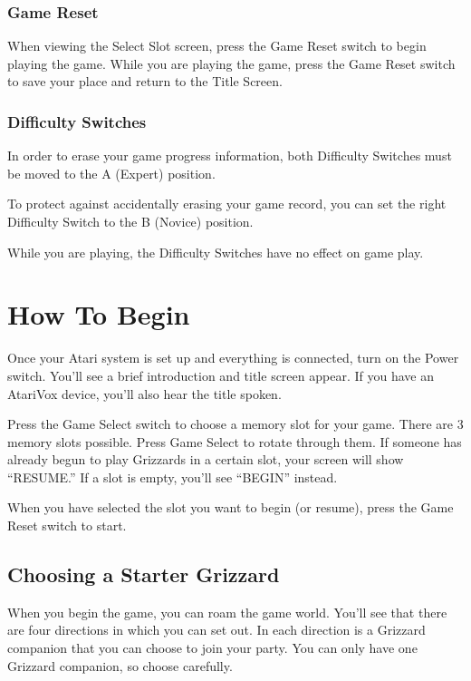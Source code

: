 \documentclass[10pt,twoside,openright]{memoir}
\begin{document}
\subsection{Game Reset}

When viewing  the Select  Slot screen,  press the  Game Reset  switch to
begin playing the  game. While you are playing the  game, press the Game
Reset switch to save your place and return to the Title Screen.

\subsection{Difficulty Switches}

In order to erase your game progress information, both Difficulty
Switches must be moved to the A (Expert) position.

To protect  against accidentally erasing  your game record, you  can set
the right Difficulty Switch to the B (Novice) position.

While  you  are playing,  the  Difficulty  Switches  have no  effect  on
game play. 

\chapter{How To Begin}

Once your Atari system is set up and everything is connected, turn on the
Power switch. You'll see a brief introduction and title screen appear. If
you have an AtariVox device, you'll also hear the title spoken.

Press the Game Select switch to choose a memory slot for your game. There
are 3 memory slots possible. Press Game Select to rotate through them. If
someone has already begun to play Grizzards in a certain slot, your screen
will show ``RESUME.'' If a slot is empty, you'll see ``BEGIN'' instead.

When you have selected the slot you want to begin (or resume), press the
Game Reset switch to start.

\section{Choosing a Starter Grizzard}

When you begin the game, you can roam the game world. You'll see that there
are four directions in which you can set out. In each direction is a
Grizzard companion that you can choose to join your party. You can only have
one Grizzard companion, so choose carefully. 
\end{document}
